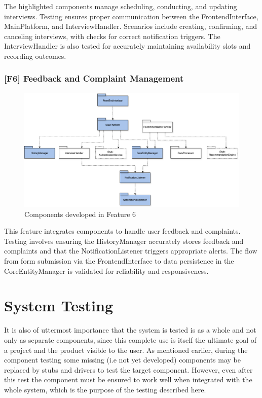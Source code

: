 The highlighted components manage scheduling, conducting, and updating interviews. Testing ensures proper communication between the FrontendInterface, MainPlatform, and InterviewHandler. Scenarios include creating, confirming, and canceling interviews, with checks for correct notification triggers. The InterviewHandler is also tested for accurately maintaining availability slots and recording outcomes.

\subsubsection{[F6] Feedback and Complaint Management}

\begin{figure}[H]
    \centering
    \includegraphics[width=\textwidth]{Images/implementation-testing-hierarchy_f6.png}
    \caption{Components developed in Feature 6}
    \label{fig:implementation_testing_f6}
\end{figure}

This feature integrates components to handle user feedback and complaints. Testing involves ensuring the HistoryManager accurately stores feedback and complaints and that the NotificationListener triggers appropriate alerts. The flow from form submission via the FrontendInterface to data persistence in the CoreEntityManager is validated for reliability and responsiveness.

\section{System Testing}
It is also of uttermost importance that the system is tested is as a whole and not only as separate components, since this complete use  is itself the ultimate goal of a project and the product visible to the user. As mentioned earlier, during the component testing some missing (i.e not yet developed) components may be replaced by stubs and drivers to test the target component. However, even after this test the component must be ensured to work well when integrated with the whole system, which is the purpose of the testing described here.

